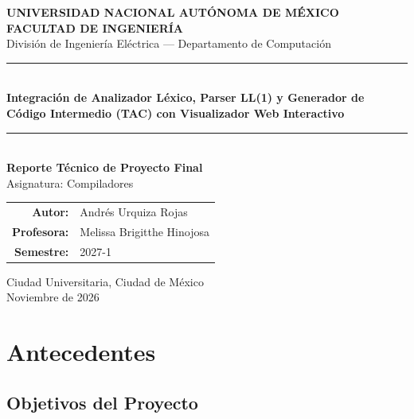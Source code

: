 \documentclass[11pt, letterpaper]{article}
\begin{document}
\begin{titlepage}
    \centering
    \vspace*{0.8cm}
    {\Large \textbf{UNIVERSIDAD NACIONAL AUTÓNOMA DE MÉXICO}}\\[0.25cm]
    {\large \textbf{FACULTAD DE INGENIERÍA}}\\[0.2cm]
    {\normalsize División de Ingeniería Eléctrica --- Departamento de Computación}\\[1.6cm]

    \rule{\linewidth}{0.8pt}\\[0.5cm]
    {\LARGE \textbf{Integración de Analizador Léxico, Parser LL(1) y Generador de Código Intermedio (TAC) con Visualizador Web Interactivo}}\\[0.4cm]
    \rule{\linewidth}{0.8pt}\\[1.2cm]

    {\large \textbf{Reporte Técnico de Proyecto Final}}\\[0.3cm]
    {\normalsize Asignatura: Compiladores}\\[2.0cm]

    \begin{tabular}{rl}
        \textbf{Autor:} & Andrés Urquiza Rojas \\[0.35cm]
        \textbf{Profesora:} & Melissa Brigitthe Hinojosa \\[0.35cm]
        \textbf{Semestre:} & 2027-1 \\
    \end{tabular}

    \vfill
    {\normalsize Ciudad Universitaria, Ciudad de México}\\[0.15cm]
    {\normalsize Noviembre de 2026}
\end{titlepage}

\tableofcontents
\newpage

\section{Antecedentes}

\subsection{Objetivos del Proyecto}
\end{document}

